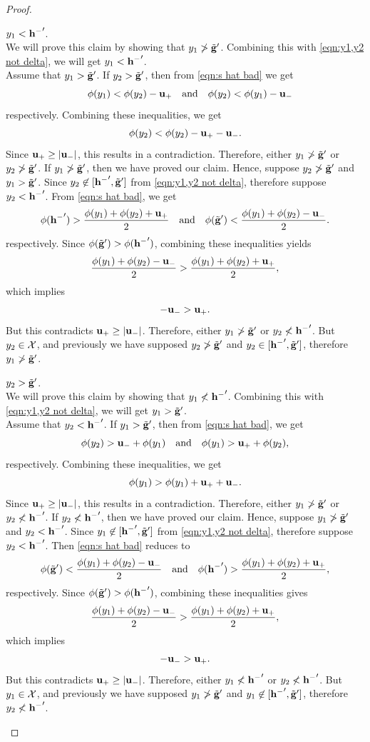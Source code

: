 \begin{proof}
\begin{claims}{$y_1 < \mathbf{h^{-}}'$.}\\
	We will prove this claim by showing that $y_1 \not> \tilde{\mathbf{g}}'$. Combining this with \eqref{eqn:y1,y2 not delta}, we will get $y_1 < \mathbf{h^{-}}'$.\\
	Assume that $y_1 > \tilde{\mathbf{g}}'$. If $y_2 > \tilde{\mathbf{g}}'$, then from \eqref{eqn:s hat bad}
we get
	\[ \quad \phi(y_1) < \phi(y_2) - \mathbf{u_+}	\hbox{\quad and\quad}
	 \phi(y_2) < \phi(y_1) - \mathbf{u_-}
	\]
	respectively.
	Combining these inequalities, we get
	\[
	\phi(y_2) < \phi(y_2) - \mathbf{u_+} - \mathbf{u_-}.
	\]
	Since $\mathbf{u_+} \geq |\mathbf{u_-}|$, this results in a contradiction. Therefore, either $y_1 \not> \tilde{\mathbf{g}}'$ or $y_2 \not> \tilde{\mathbf{g}}'$. If $y_1 \not> \tilde{\mathbf{g}}'$, then we have proved our claim. Hence, suppose $y_2 \not> \tilde{\mathbf{g}}'$ and $y_1 > \tilde{\mathbf{g}}'$. Since $y_2 \not\in [\mathbf{h^{-}}', \tilde{\mathbf{g}}']$ from \eqref{eqn:y1,y2 not delta}, therefore suppose $y_2 < \mathbf{h^{-}}'$.
	From \eqref{eqn:s hat bad}, we get
	\[
	\phi(\mathbf{h^{-}}') > \frac{\phi(y_1) + \phi(y_2) + \mathbf{u_+}}{2}
	\hbox{\quad and\quad}
 \phi(\tilde{\mathbf{g}}') < \frac{\phi(y_1) + \phi(y_2) - \mathbf{u_-}}{2}.
	\]
	respectively.
	Since $\phi(\tilde{\mathbf{g}}') > \phi(\mathbf{h^{-}}')$, combining these inequalities yields
	\[
	\frac{\phi(y_1) + \phi(y_2) - \mathbf{u_-}}{2} > \frac{\phi(y_1) + \phi(y_2) + \mathbf{u_+}}{2},
	\]
	which implies
	\[
	-\mathbf{u_-} > \mathbf{u_+}.
	\]
	But this contradicts  $\mathbf{u_+} \geq |\mathbf{u_-}|$.
	Therefore, either $y_1 \not> \tilde{\mathbf{g}}'$ or $y_2 \not< \mathbf{h^{-}}'$. But $y_2 \in \mathcal{X}$, and previously we have supposed $y_2 \not> \tilde{\mathbf{g}}'$ and $y_2 \in [\mathbf{h^{-}}',\tilde{\mathbf{g}}']$, therefore $y_1 \not> \tilde{\mathbf{g}}'$.


\end{claims}

\begin{claims}{$y_2 > \tilde{\mathbf{g}}'$.}\\
	We will prove this claim by showing that $y_1 \not< \mathbf{h^{-}}'$. Combining this with \eqref{eqn:y1,y2 not delta}, we will get $y_1 > \tilde{\mathbf{g}}'$.\\
	Assume that $y_2 < \mathbf{h^{-}}'$.
	If $y_1 > \tilde{\mathbf{g}}'$, then from \eqref{eqn:s hat bad}, we get
	\[\phi(y_2) > \mathbf{u_-} + \phi(y_1) \hbox{\quad and\quad}
 \phi(y_1) > \mathbf{u_+} + \phi(y_2),
	\]
	respectively.
	Combining these inequalities, we get
	\[
	\phi(y_1) > \phi(y_1) + \mathbf{u_+} + \mathbf{u_-}.
	\]
	Since $\mathbf{u_+} \geq |\mathbf{u_-}|$, this results in a contradiction.
	Therefore, either $y_1 \not> \tilde{\mathbf{g}}'$ or $y_2 \not< \mathbf{h^{-}}'$. If $y_2 \not< \mathbf{h^{-}}'$, then we have proved our claim. Hence, suppose $y_1 \not> \tilde{\mathbf{g}}'$ and $y_2 < \mathbf{h^{-}}'$. Since $y_1 \not\in [\mathbf{h^{-}}',\tilde{\mathbf{g}}']$ from \eqref{eqn:y1,y2 not delta}, therefore suppose $y_2 < \mathbf{h^{-}}'$. Then \eqref{eqn:s hat bad} reduces to
	\[ \phi(\tilde{\mathbf{g}}') < \frac{\phi(y_1) + \phi(y_2) - \mathbf{u_-}}{2} \hbox{\quad and\quad}
 \phi(\mathbf{h^{-}}') > \frac{\phi(y_1) + \phi(y_2) + \mathbf{u_+}}{2},
	\]
	respectively.
	Since $\phi(\tilde{\mathbf{g}}') > \phi(\mathbf{h^{-}}')$, combining these inequalities gives
	\[
	\frac{\phi(y_1) + \phi(y_2) - \mathbf{u_-}}{2} > \frac{\phi(y_1) + \phi(y_2) + \mathbf{u_+}}{2},
	\]
	which implies
	\[
	-\mathbf{u_-} > \mathbf{u_+}.
	\]
	But this contradicts $\mathbf{u_+} \geq |\mathbf{u_-}|$. Therefore, either $y_1 \not< \mathbf{h^{-}}'$ or $y_2 \not< \mathbf{h^{-}}'$. But $y_1 \in \mathcal{X}$, and previously we have supposed $y_1 \not> \tilde{\mathbf{g}}'$ and $y_1 \not\in [\mathbf{h^{-}}',\tilde{\mathbf{g}}']$, therefore $y_2 \not< \mathbf{h^{-}}'$.


\end{claims}
\end{proof}
